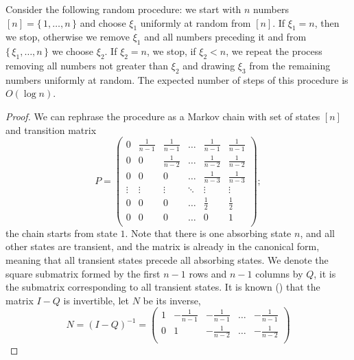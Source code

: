 \documentclass[a4paper,USenglish]{socg-lipics-v2018}
\begin{document}
\begin{lemma}
Consider the following random procedure: we start with $n$ numbers $[n] = \{\,1,\dots, n\,\}$ and 
choose $\xi_1$ uniformly at random from $[n]$. If $\xi_1 = n$, then we stop,
otherwise we remove $\xi_1$ and all numbers preceding it and from $\{\,\xi_1, \dots, n\,\}$
we choose $\xi_2$. If $\xi_2 = n$, we stop, if $\xi_2 < n$, we repeat the process removing all numbers not greater than $\xi_2$ and
drawing $\xi_3$ from the remaining numbers uniformly at random. The expected number of steps of this procedure
is $O(\log n)$.
\end{lemma}
\begin{proof}
We can rephrase the procedure as a Markov chain with set of states $[n]$ and transition matrix
\begin{equation}
    P = \begin{pmatrix}
         0      & \frac{1}{n-1} & \frac{1}{n-1} & \dots  & \frac{1}{n-1} & \frac{1}{n-1} \\
         0      &  0            & \frac{1}{n-2} & \dots  & \frac{1}{n-2} & \frac{1}{n-2} \\
         0      &  0            & 0             & \dots  & \frac{1}{n-3} & \frac{1}{n-3} \\
         \vdots &  \vdots       & \vdots        & \ddots & \vdots        & \vdots \\
         0      &  0            & 0             & \dots  & \frac{1}{2} & \frac{1}{2} \\
         0      &  0            & 0             & \dots  & 0           & 1           \\
        \end{pmatrix};
\end{equation}
the chain starts from state $1$.
Note that there is one absorbing state $n$, and all other states are transient, and the matrix is already in the canonical
form, meaning that all transient states precede all absorbing states. 
We denote the square submatrix formed by the first $n-1$
rows and $n-1$ columns by $Q$, it is the submatrix corresponding to all transient states. It is known
(\cite{absorbing_markov_chain}) that the matrix $I-Q$ is invertible, let $N$ be its inverse,
\begin{equation}
N = (I- Q)^{-1} = 
\begin{pmatrix}
         1      & -\frac{1}{n-1} & -\frac{1}{n-1} & \dots  & -\frac{1}{n-1}  \\
         0      &  1             & -\frac{1}{n-2} & \dots  & -\frac{1}{n-2}  \\

\end{pmatrix}
\end{equation}
\end{proof}
\end{document}
